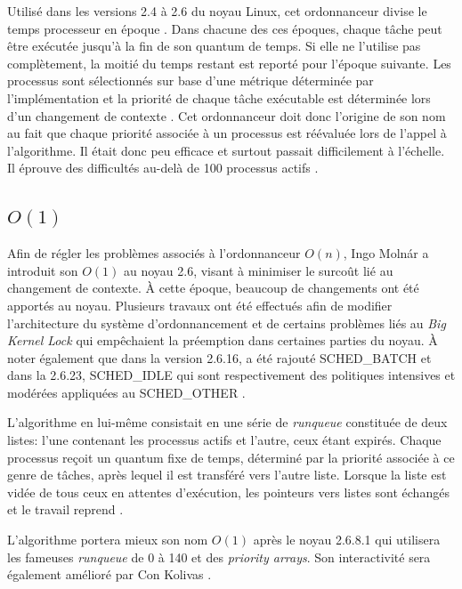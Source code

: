\documentclass[letterpaper]{article}
\begin{document}
Utilisé dans les versions 2.4 à 2.6 du noyau Linux, cet ordonnanceur divise le temps processeur en \og époque \fg. Dans chacune des ces époques, chaque tâche peut être exécutée jusqu'à la fin de son quantum de temps. Si elle ne l'utilise pas complètement, la moitié du temps restant est reporté pour l'époque suivante. Les processus sont sélectionnés sur base d'une métrique déterminée par l'implémentation et la priorité de chaque tâche exécutable est déterminée lors d'un changement de contexte \citep{Bovet:2005:ULK:1077084}.
Cet ordonnanceur doit donc l'origine de son nom au fait que chaque priorité associée à un processus est réévaluée lors de l'appel à l'algorithme. Il était donc peu efficace et surtout passait difficilement à l'échelle. Il éprouve des difficultés au-delà de 100 processus actifs \citep{Nieh:2001:VRO:647055.715911}.

\subsection{$O(1)$}

Afin de régler les problèmes associés à l'ordonnanceur $O(n)$, Ingo Molnár a introduit son $O(1)$ au noyau 2.6, visant à minimiser le surcoût lié au changement de contexte. À cette époque, beaucoup de changements ont été apportés au noyau. Plusieurs travaux ont été effectués afin de modifier l'architecture du système d'ordonnancement et de certains problèmes liés au \textit{Big Kernel Lock} \citep{bryant2003linux} qui empêchaient la préemption dans certaines parties du noyau. À noter également que dans la version 2.6.16, a été rajouté SCHED\_BATCH et dans la 2.6.23, SCHED\_IDLE qui sont respectivement des politiques intensives et modérées appliquées au SCHED\_OTHER \citep{Pabla:2009:CFS:1594371.1594375}. 

L'algorithme en lui-même consistait en une série de \textit{runqueue} constituée de deux listes: l'une contenant les processus actifs et l'autre, ceux étant expirés. Chaque processus reçoit un quantum fixe de temps, déterminé par la priorité associée à ce genre de tâches, après lequel il est transféré vers l'autre liste. Lorsque la liste est vidée de tous ceux en attentes d'exécution, les pointeurs vers listes sont échangés et le travail reprend \citep{Love:2010:LKD:1855096}.

L'algorithme portera mieux son nom $O(1)$ après le noyau 2.6.8.1 qui utilisera les fameuses \textit{runqueue} de 0 à 140 et des \textit{priority arrays}. Son interactivité sera également amélioré par Con Kolivas \citep{Aas05understandingthe}.
\end{document}
